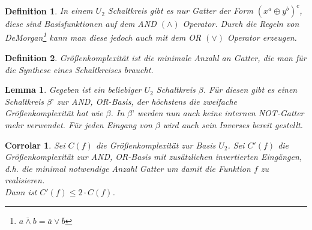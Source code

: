 \documentclass[a4paper]{article}
\newtheorem{lemma}{Lemma}
\newtheorem{coro}{Corrolar}
\newtheorem{defi}{Definition}
\begin{document}


$\;$ \\
\begin{defi}
  In einem $U_2$ Schaltkreis gibt es nur Gatter der Form $(x^a\oplus y^b)^c$, diese sind Basisfunktionen auf dem AND $(\wedge)$ Operator.
  Durch die Regeln von DeMorgan\footnote{$\overline{a\land{}b}=\overline{a}\lor\overline{b}$} kann man diese jedoch auch mit dem OR $(\vee)$ Operator
  erzeugen.
\end{defi}

\begin{defi}
  Gr\"o\ss{}enkomplexit\"at ist die minimale Anzahl an Gatter, die man f\"ur die Synthese eines Schaltkreises braucht.
\end{defi}


\begin{lemma}
  Gegeben ist ein beliebiger $U_2$ Schaltkreis $\beta$. F\"ur diesen gibt es einen Schaltkreis $\beta’$ zur AND, OR-Basis, der h\"ochstens
  die zweifache Gr\"o\ss{}enkomplexit\"at hat wie $\beta$. In $\beta’$ werden nun auch keine internen NOT-Gatter mehr verwendet. F\"ur
  jeden Eingang von $\beta$ wird auch sein Inverses bereit gestellt.
\end{lemma}

\begin{coro}
  Sei $C(f)$ die Größenkomplexität zur Basis $U_2$. Sei $C'(f)$ die
  Größenkomplexität zur AND, OR-Basis mit zusätzlichen invertierten
  Eingängen, d.h. die minimal notwendige Anzahl Gatter um damit die
  Funktion $f$ zu realisieren.\\
  Dann ist $C'(f) \leq 2 \cdot C(f)$.
\end{coro}
\end{document}
